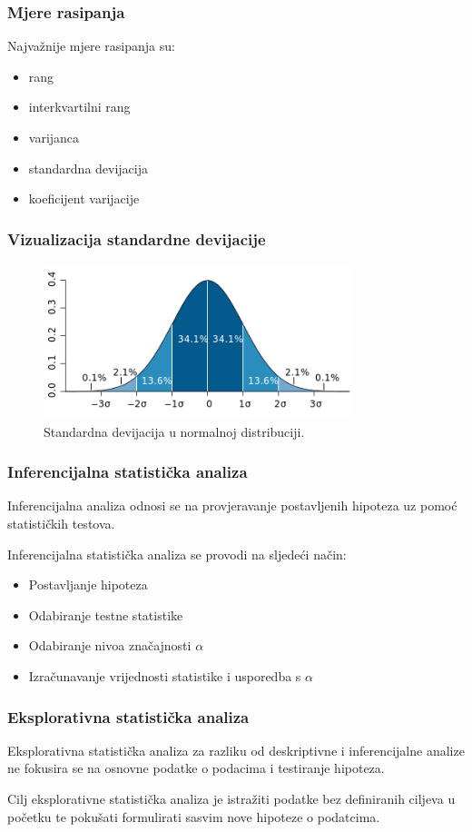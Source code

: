 \documentclass{beamer}
\begin{document}
\begin{frame}
\frametitle{Mjere rasipanja}
Najvažnije mjere rasipanja su:
\begin{itemize}
 \item rang
 \item interkvartilni rang
 \item varijanca
 \item standardna devijacija
 \item koeficijent varijacije
\end{itemize}
\end{frame}


\begin{frame}
\frametitle{Vizualizacija standardne devijacije}
\bigskip
\begin{figure}[]
	\centering
	\small
	\includegraphics[width=9cm]{img/deviation.png}
	\caption{Standardna devijacija u normalnoj distribuciji.}
	\label{fig:deviation}
\end{figure}
\bigskip
\end{frame}

\begin{frame}
\frametitle{Inferencijalna statistička analiza}
Inferencijalna analiza odnosi se na provjeravanje postavljenih hipoteza uz pomoć statističkih testova.

\bigskip
Inferencijalna statistička analiza se provodi na sljedeći način:

\begin{itemize}
 \item Postavljanje hipoteza
 \item Odabiranje testne statistike
 \item Odabiranje nivoa značajnosti $\alpha$
 \item Izračunavanje vrijednosti statistike i usporedba s $\alpha$
\end{itemize}
\end{frame}

\begin{frame}
\frametitle{Eksplorativna statistička analiza}
Eksplorativna statistička analiza za razliku od deskriptivne i inferencijalne analize ne fokusira se na osnovne podatke o podacima i testiranje hipoteza.
\bigskip

Cilj eksplorativne statistička analiza je istražiti podatke bez definiranih ciljeva u početku te pokušati formulirati sasvim nove hipoteze o podatcima.
\end{frame}
\end{document}
